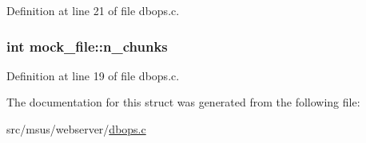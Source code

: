Definition at line 21 of file dbops.\-c.

\hypertarget{structmock__file_a18485ea7673b7336615d1a47ce8169eb}{
\subsubsection[{n\-\_\-chunks}]{\setlength{\rightskip}{0pt plus 5cm}int mock\-\_\-file\-::n\-\_\-chunks}}\label{structmock__file_a18485ea7673b7336615d1a47ce8169eb}


Definition at line 19 of file dbops.\-c.



The documentation for this struct was generated from the following file\-:\begin{DoxyCompactItemize}
\item 
src/msus/webserver/\hyperlink{dbops_8c}{dbops.\-c}\end{DoxyCompactItemize}
